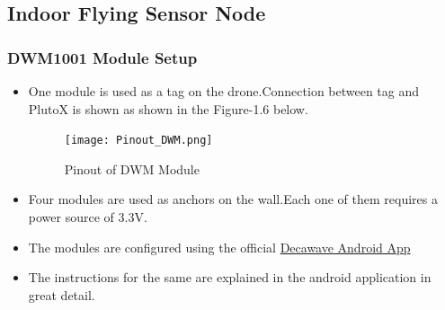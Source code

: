 \documentclass[a4paper,12pt,oneside]{book}
\begin{document}
\subsection*{Indoor Flying Sensor Node} 

\subsubsection*{DWM1001 Module Setup}
\begin{itemize}
  \item One module is used as a tag on the drone.Connection between tag and PlutoX is shown as shown in the Figure-1.6 below.
  \begin{figure}[H]
 \centering
 \texttt{[image: Pinout\_DWM.png]}
 \caption{Pinout of DWM Module}
 \end{figure}
  \item Four modules are used as anchors on the wall.Each one of them requires a power source of 3.3V.

  \item The modules are configured using the official \href{https://play.google.com/store/apps/details?id=com.decawave.argomanager}{Decawave Android App}
  \item The instructions for the same are explained in the android application in great detail. 
 \end{itemize}
\end{document}
